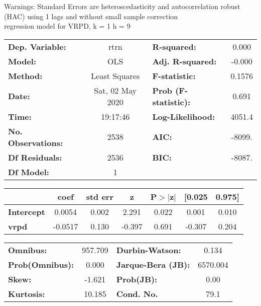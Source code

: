 Warnings: \newline
 [1] Standard Errors are heteroscedasticity and autocorrelation robust (HAC) using 1 lags and without small sample correction\\ 

regression model for VRPD, k = 1 h = 9\begin{center}
\begin{tabular}{lclc}
\toprule
\textbf{Dep. Variable:}    &       rtrn       & \textbf{  R-squared:         } &     0.000   \\
\textbf{Model:}            &       OLS        & \textbf{  Adj. R-squared:    } &    -0.000   \\
\textbf{Method:}           &  Least Squares   & \textbf{  F-statistic:       } &    0.1576   \\
\textbf{Date:}             & Sat, 02 May 2020 & \textbf{  Prob (F-statistic):} &    0.691    \\
\textbf{Time:}             &     19:17:46     & \textbf{  Log-Likelihood:    } &    4051.4   \\
\textbf{No. Observations:} &        2538      & \textbf{  AIC:               } &    -8099.   \\
\textbf{Df Residuals:}     &        2536      & \textbf{  BIC:               } &    -8087.   \\
\textbf{Df Model:}         &           1      & \textbf{                     } &             \\
\bottomrule
\end{tabular}
\begin{tabular}{lcccccc}
                   & \textbf{coef} & \textbf{std err} & \textbf{z} & \textbf{P$> |$z$|$} & \textbf{[0.025} & \textbf{0.975]}  \\
\midrule
\textbf{Intercept} &       0.0054  &        0.002     &     2.291  &         0.022        &        0.001    &        0.010     \\
\textbf{vrpd}      &      -0.0517  &        0.130     &    -0.397  &         0.691        &       -0.307    &        0.204     \\
\bottomrule
\end{tabular}
\begin{tabular}{lclc}
\textbf{Omnibus:}       & 957.709 & \textbf{  Durbin-Watson:     } &    0.134  \\
\textbf{Prob(Omnibus):} &   0.000 & \textbf{  Jarque-Bera (JB):  } & 6570.004  \\
\textbf{Skew:}          &  -1.621 & \textbf{  Prob(JB):          } &     0.00  \\
\textbf{Kurtosis:}      &  10.185 & \textbf{  Cond. No.          } &     79.1  \\
\bottomrule
\end{tabular}
\end{center}

